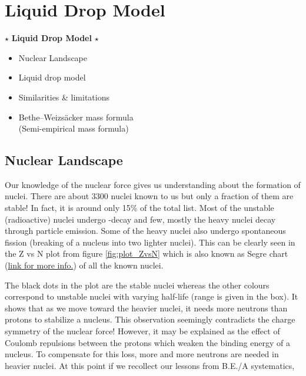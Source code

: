 \chapter{Liquid Drop Model}

\begin{tcolorbox} [colframe=blue!10!black,colback=yellow!29.05!white,arc=1em,fonttitle=\bfseries,title= \textit{Key Objective:}, width = \textwidth]
$\star$ \textbf{Liquid Drop Model} $\star$
\begin{itemize}
    \item Nuclear Landscape
    \item Liquid drop model
    \item Similarities \& limitations
    \item Bethe–Weizsäcker mass formula \\ (Semi-empirical mass formula) 
\end{itemize}
\end{tcolorbox}

\pagebreak\section{Nuclear Landscape}
Our knowledge of the nuclear force gives us understanding about the formation of nuclei. There are about 3300 nuclei known to us but only a fraction of them are stable! In fact, it is around only 15\% of the total list. Most of the unstable (radioactive) nuclei undergo -decay and few, mostly the heavy nuclei decay through  particle emission. Some of the heavy nuclei also undergo spontaneous fission (breaking of a nucleus into two lighter nuclei). This can be clearly seen in the Z vs N plot from figure \ref{fig:plot_ZvsN} which is also known as Segre chart (\href{https://www.nndc.bnl.gov/nudat2/}{link for more info.}) of all the known nuclei.



\par The black dots in the plot are the stable nuclei whereas the other colours correspond to unstable nuclei with varying half-life (range is given in the box). It shows that as we move toward the heavier nuclei, it needs more neutrons than protons to stabilize a nucleus. This observation seemingly contradicts the charge symmetry of the nuclear force! However, it may be explained as the effect of Coulomb repulsions between the protons which weaken the binding energy of a nucleus. To compensate for this loss, more and more neutrons are needed in heavier nuclei. At this point if we recollect our lessons from B.E./A systematics,


